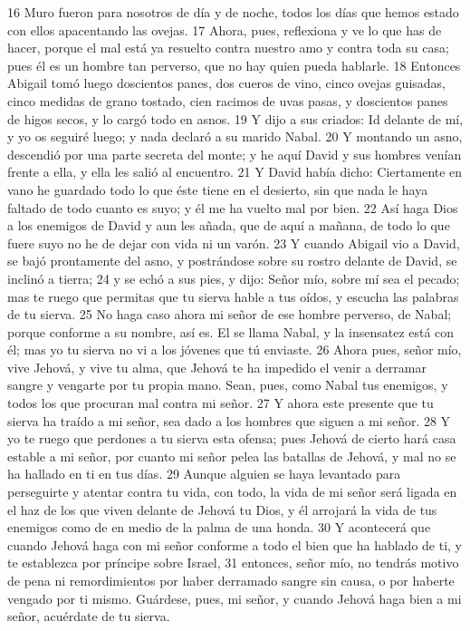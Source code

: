 16 Muro fueron para nosotros de día y de noche, todos los días que hemos estado con ellos apacentando las ovejas.
17 Ahora, pues, reflexiona y ve lo que has de hacer, porque el mal está ya resuelto contra nuestro amo y contra toda su casa; pues él es un hombre tan perverso, que no hay quien pueda hablarle.
18 Entonces Abigail tomó luego doscientos panes, dos cueros de vino, cinco ovejas guisadas, cinco medidas   de grano tostado, cien racimos de uvas pasas, y doscientos panes de higos secos, y lo cargó todo en asnos.
19 Y dijo a sus criados: Id delante de mí, y yo os seguiré luego; y nada declaró a su marido Nabal.
20 Y montando un asno, descendió por una parte secreta del monte; y he aquí David y sus hombres venían frente a ella, y ella les salió al encuentro.
21 Y David había dicho: Ciertamente en vano he guardado todo lo que éste tiene en el desierto, sin que nada le haya faltado de todo cuanto es suyo; y él me ha vuelto mal por bien.
22 Así haga Dios a los enemigos de David y aun les añada, que de aquí a mañana, de todo lo que fuere suyo no he de dejar con vida ni un varón.
23 Y cuando Abigail vio a David, se bajó prontamente del asno, y postrándose sobre su rostro delante de David, se inclinó a tierra;
24 y se echó a sus pies, y dijo: Señor mío, sobre mí sea el pecado; mas te ruego que permitas que tu sierva hable a tus oídos, y escucha las palabras de tu sierva.
25 No haga caso ahora mi señor de ese hombre perverso, de Nabal; porque conforme a su nombre, así es. El se llama Nabal, y la insensatez está con él; mas yo tu sierva no vi a los jóvenes que tú enviaste.
26 Ahora pues, señor mío, vive Jehová, y vive tu alma, que Jehová te ha impedido el venir a derramar sangre y vengarte por tu propia mano. Sean, pues, como Nabal tus enemigos, y todos los que procuran mal contra mi señor.
27 Y ahora este presente que tu sierva ha traído a mi señor, sea dado a los hombres que siguen a mi señor.
28 Y yo te ruego que perdones a tu sierva esta ofensa; pues Jehová de cierto hará casa estable a mi señor, por cuanto mi señor pelea las batallas de Jehová, y mal no se ha hallado en ti en tus días.
29 Aunque alguien se haya levantado para perseguirte y atentar contra tu vida, con todo, la vida de mi señor será ligada en el haz de los que viven delante de Jehová tu Dios, y él arrojará la vida de tus enemigos como de en medio de la palma de una honda.
30 Y acontecerá que cuando Jehová haga con mi señor conforme a todo el bien que ha hablado de ti, y te establezca por príncipe sobre Israel,
31 entonces, señor mío, no tendrás motivo de pena ni remordimientos por haber derramado sangre sin causa, o por haberte vengado por ti mismo. Guárdese, pues, mi señor, y cuando Jehová haga bien a mi señor, acuérdate de tu sierva.
